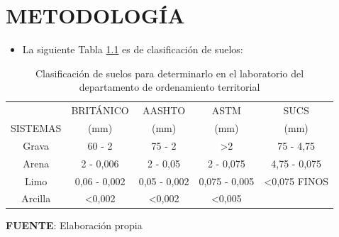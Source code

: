 \chapter{METODOLOGÍA}
\thispagestyle{empty}

\begin{itemize}[leftmargin=1em]
    \item La siguiente Tabla \ref{tab:my-table1} es de clasificación de suelos:
\end{itemize}
\begin{table}[H]
\centering
\begin{threeparttable}
\caption[Clasificación de suelos]{Clasificación de suelos para determinarlo en el laboratorio del departamento de ordenamiento territorial}
\label{tab:my-table1}
\begin{tabular}{@{}ccccc@{}}
\hline
\multicolumn{1}{|c|}{} &
  \multicolumn{1}{c|}{BRITÁNICO} &
  \multicolumn{1}{c|}{AASHTO} &
  \multicolumn{1}{c|}{ASTM} &
  \multicolumn{1}{c|}{SUCS} \\ \cline{2-5} 
\multicolumn{1}{|c|}{\multirow{-2}{*}{SISTEMAS}} &
  \multicolumn{1}{c|}{{\color[HTML]{4D5156} (mm)}} &
  \multicolumn{1}{c|}{{\color[HTML]{4D5156} (mm)}} &
  \multicolumn{1}{c|}{{\color[HTML]{4D5156} (mm)}} &
  \multicolumn{1}{c|}{{\color[HTML]{4D5156} (mm)}} \\ \hline
\multicolumn{1}{|c|}{Grava} &
  \multicolumn{1}{c|}{60 - 2} &
  \multicolumn{1}{c|}{75 - 2} &
  \multicolumn{1}{c|}{\textgreater 2} &
  \multicolumn{1}{c|}{75 - 4,75} \\ \hline
\multicolumn{1}{|c|}{Arena} &
  \multicolumn{1}{c|}{2 - 0,006} &
  \multicolumn{1}{c|}{2 - 0,05} &
  \multicolumn{1}{c|}{2 - 0,075} &
  \multicolumn{1}{c|}{4,75 - 0,075} \\ \hline
\multicolumn{1}{|c|}{Limo} &
  \multicolumn{1}{c|}{0,06 - 0,002} &
  \multicolumn{1}{c|}{0,05 - 0,002} &
  \multicolumn{1}{c|}{0,075 - 0,005} &
  \multicolumn{1}{c|}{\textless 0,075 FINOS} \\ \hline
\multicolumn{1}{|c|}{Arcilla} &
  \multicolumn{1}{c|}{\textless  0,002} &
  \multicolumn{1}{c|}{\textless  0,002} &
  \multicolumn{1}{c|}{\textless  0,005} &
  \multicolumn{1}{c|}{} \\ \hline
\end{tabular}
    \begin{tablenotes}
    \vspace{-0.5cm}
      \item {{\fontsize{10pt}{ \baselineskip}\selectfont \textbf{FUENTE}: Elaboración propia}}
    \end{tablenotes}
\end{threeparttable}
\end{table}


